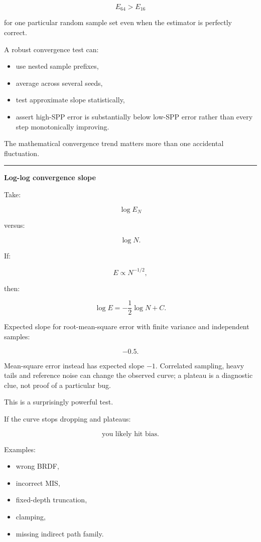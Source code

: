 \[
E_{64}>E_{16}
\]

for one particular random sample set even when the estimator is perfectly correct.

A robust convergence test can:

\begin{itemize}
\tightlist
\item
  use nested sample prefixes,
\item
  average across several seeds,
\item
  test approximate slope statistically,
\item
  assert high-SPP error is substantially below low-SPP error rather than every step monotonically improving.
\end{itemize}

The mathematical convergence trend matters more than one accidental fluctuation.

\begin{center}\rule{0.5\linewidth}{0.5pt}\end{center}

\textbf{Log-log convergence slope}

Take:

\[
\log E_N
\]

versus:

\[
\log N.
\]

If:

\[
E\propto N^{-1/2},
\]

then:

\[
\log E
=
-\frac12\log N+C.
\]

Expected slope for root-mean-square error with finite variance and independent samples:

\[
\boxed{-0.5.}
\]

Mean-square error instead has expected slope \(-1\). Correlated sampling, heavy tails and reference noise can change the observed curve; a plateau is a diagnostic clue, not proof of a particular bug.

This is a surprisingly powerful test.

If the curve stops dropping and plateaus:

\[
\boxed{
\text{you likely hit bias}.
}
\]

Examples:

\begin{itemize}
\tightlist
\item
  wrong BRDF,
\item
  incorrect MIS,
\item
  fixed-depth truncation,
\item
  clamping,
\item
  missing indirect path family.
\end{itemize}

